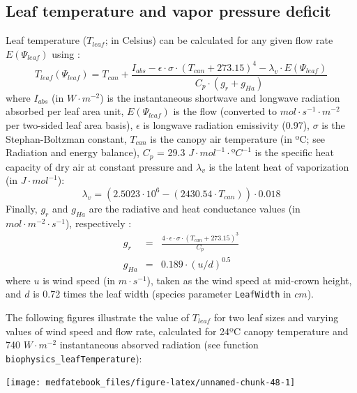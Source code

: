 \documentclass[]{book}
\begin{document}
\hypertarget{leaf-temperature-and-vapor-pressure-deficit}{%
\subsection{Leaf temperature and vapor pressure deficit}\label{leaf-temperature-and-vapor-pressure-deficit}}

Leaf temperature (\(T_{leaf}\); in Celsius) can be calculated for any given flow rate \(E(\Psi_{leaf})\) using \citep{Campbell1998}:
\begin{equation}
T_{leaf}(\Psi_{leaf}) = T_{can}+\frac{I_{abs}-\epsilon\cdot\sigma\cdot(T_{can}+273.15)^4-\lambda_v\cdot E(\Psi_{leaf})}{C_p\cdot(g_r+g_{Ha})}
\end{equation}
where \(I_{abs}\) (in \(W \cdot m^{-2}\)) is the instantaneous shortwave and longwave radiation absorbed per leaf area unit, \(E(\Psi_{leaf})\) is the flow (converted to \(mol \cdot s^{-1} \cdot m^{-2}\) per two-sided leaf area basis), \(\epsilon\) is longwave radiation emissivity (0.97), \(\sigma\) is the Stephan-Boltzman constant, \(T_{can}\) is the canopy air temperature (in ºC; see Radiation and energy balance), \(C_p\) = 29.3 \(J \cdot mol^{-1} \cdot ºC^{-1}\) is the specific heat capacity of dry air at constant pressure and \(\lambda_v\) is the latent heat of vaporization (in \(J \cdot mol^{-1}\)):
\begin{equation}
\lambda_v = (2.5023\cdot 10^6-(2430.54\cdot T_{can}))\cdot 0.018
\end{equation}
Finally, \(g_r\) and \(g_{Ha}\) are the radiative and heat conductance values (in \(mol \cdot m^{-2} \cdot s^{-1}\)), respectively \citep{Campbell1998}:
\begin{eqnarray}
g_r &=& \frac{4\cdot \epsilon \cdot \sigma \cdot (T_{can}+273.15)^3}{C_p} \\
g_{Ha} &=& 0.189 \cdot (u/d)^{0.5}
\end{eqnarray}
where \(u\) is wind speed (in \(m \cdot s^{-1}\)), taken as the wind speed at mid-crown height, and \(d\) is 0.72 times the leaf width (species parameter \texttt{LeafWidth} in \(cm\)).

The following figures illustrate the value of \(T_{leaf}\) for two leaf sizes and varying values of wind speed and flow rate, calculated for 24ºC canopy temperature and 740 \(W \cdot m^{-2}\) instantaneous absorved radiation (see function \texttt{biophysics\_leafTemperature}):

\begin{center}\texttt{[image: medfatebook\_files/figure-latex/unnamed-chunk-48-1]} \end{center}
\end{document}
